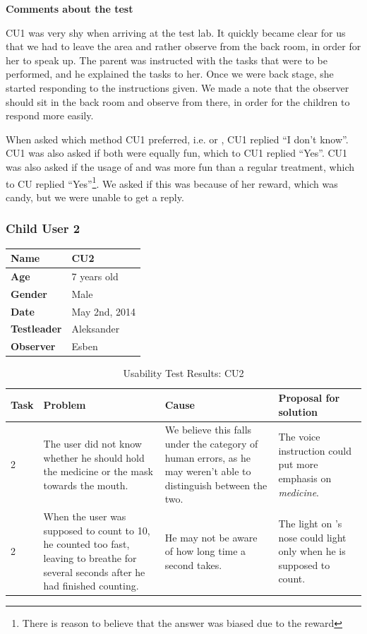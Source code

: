 \textbf{Comments about the test}

CU1 was very shy when arriving at the test lab. It quickly became clear for us that we had to leave the area and rather observe from the back room, in order for her to speak up. The parent was instructed with the tasks that were to be performed, and he explained the tasks to her. Once we were back stage, she started responding to the instructions given. We made a note that the observer should sit in the back room and observe from there, in order for the children to respond more easily.   

When asked which method CU1 preferred, i.e. \app{} or \ab{}, CU1 replied ``I don't know''. CU1 was also asked if both were equally fun, which to CU1 replied ``Yes''. CU1 was also asked if the usage of \app{} and \ab{} was more fun than a regular treatment, which to CU replied ``Yes''\footnote{There is reason to believe that the answer was biased due to the reward}. We asked if this was because of her reward, which was candy, but we were unable to get a reply. 

\subsubsection{Child User 2}
\begin{table}[H]
\centering
\begin{tabular}{| p{4.0cm} | p{4.0cm} |}
\hline
 \textbf{Name} & CU2 \\
 \hline
 \textbf{Age} & 7 years old \\
 \hline 
 \textbf{Gender} & Male \\
 \hline
 \textbf{Date} & May 2nd, 2014 \\
 \hline
 \textbf{Testleader} & Aleksander \\
 \hline
 \textbf{Observer} & Esben \\
 \hline
\end{tabular}
\end{table}

\begin{table}[H]
\centering
\begin{tabular}{| p{1.0cm} | p{4.0cm} | p{4.0cm} | p{4.0cm} |}
\hline
	\textbf{Task} & \textbf{Problem} & \textbf{Cause} & \textbf{Proposal for solution} \\
	\hline
	2 & The user did not know whether he should hold the medicine or the mask towards the mouth. & We believe this falls under the category of human errors, as he may weren't able to distinguish between the two. & The voice instruction could put more emphasis on \emph{medicine}. \\
	\hline
	2 & When the user was supposed to count to 10, he counted too fast, leaving \ab{} to breathe for several seconds after he had finished counting. & He may not be aware of how long time a second takes. & The light on \ab{}'s nose could light only when he is supposed to count. \\
	\hline
\end{tabular}
\caption{Usability Test Results: CU2}
\label{tab:testchild2}
\end{table}

